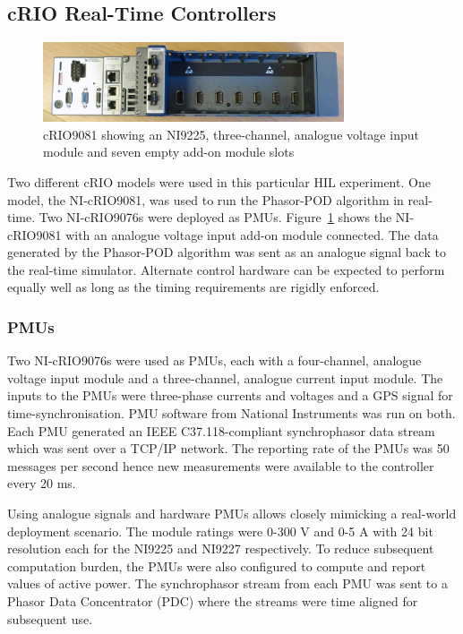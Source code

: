 \documentclass[conference]{IEEEtran}
\begin{document}
\subsection{cRIO Real-Time Controllers}
\begin{figure}[H]
\centering
\includegraphics[width=3.5in]{DSC05446.JPG}
\vspace{-0.5em}
\caption{cRIO9081 showing an NI9225, three-channel, analogue voltage input module and seven empty add-on module slots}
\label{cRIO}
\end{figure}
Two different cRIO models were used in this particular HIL experiment. One model, the NI-cRIO9081, was used to run the Phasor-POD algorithm in real-time. Two NI-cRIO9076s were deployed as PMUs. Figure~\ref{cRIO} shows the NI-cRIO9081 with an analogue voltage input add-on module connected. The data generated by the Phasor-POD algorithm was sent as an analogue signal back to the real-time simulator. Alternate control hardware can be expected to perform equally well as long as the timing requirements are rigidly enforced.

\subsubsection*{PMUs} Two NI-cRIO9076s were used as PMUs, each with a four-channel, analogue voltage input module and a three-channel, analogue current input module. The inputs to the PMUs were three-phase currents and voltages and a GPS signal for time-synchronisation. PMU software from National Instruments was run on both. Each PMU generated an IEEE C37.118-compliant synchrophasor data stream which was sent over a TCP/IP network. The reporting rate of the PMUs was 50 messages per second hence new measurements were available to the controller every 20 ms. 

Using analogue signals and hardware PMUs allows closely mimicking a real-world deployment scenario. The module ratings were 0-300 V and 0-5 A with 24 bit resolution each\cite{cRIO9081} for the NI9225 and NI9227 respectively. To reduce subsequent computation burden, the PMUs were also configured to compute and report values of active power. The synchrophasor stream from each PMU was sent to a Phasor Data Concentrator (PDC)\cite{SEL} where the streams were time aligned for subsequent use.
\end{document}
